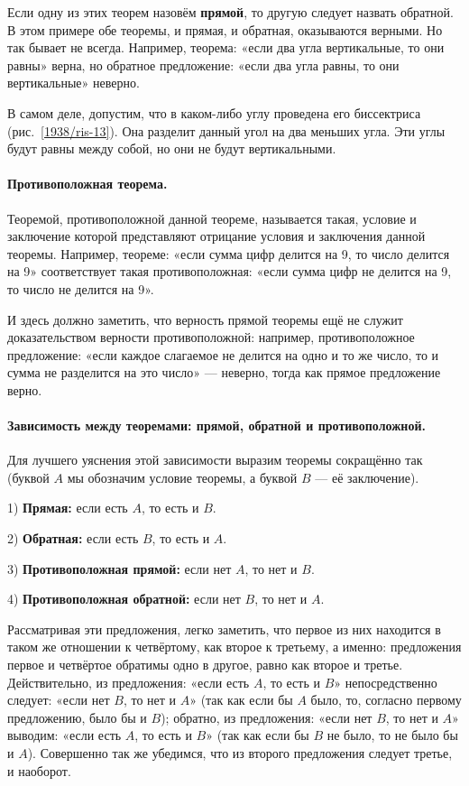 \documentclass[oneside]{book}
\begin{document}
\medskip

Если одну из этих теорем назовём \textbf{прямой}, то другую следует назвать обратной.
В этом примере обе теоремы, и прямая, и обратная, оказываются верными.
Но так бывает не всегда.
Например, теорема:
«если два угла вертикальные, то они равны» верна, но обратное предложение:
«если два угла равны, то они вертикальные» неверно.

В самом деле, допустим, что в каком-либо углу проведена его биссектриса (рис.~\ref{1938/ris-13}).
Она разделит данный угол на два меньших угла.
Эти углы будут равны между собой, но они не будут вертикальными.

\paragraph{Противоположная теорема.}\label{1938/31}
Теоремой, противоположной данной теореме, называется такая, условие и заключение которой представляют отрицание условия и заключения данной теоремы.
Например, теореме:
«если сумма цифр делится на 9, то число делится на 9» соответствует такая противоположная:
«если сумма цифр не делится на 9, то число не делится на 9».

И здесь должно заметить, что верность прямой теоремы ещё не служит доказательством верности противоположной:
например, противоположное предложение:
«если каждое слагаемое не делится на одно и то же число, то и сумма не разделится на это число» — неверно, тогда как прямое предложение верно.

\paragraph{Зависимость между теоремами: прямой, обратной и противоположной.}\label{1938/32}
Для лучшего уяснения этой зависимости выразим теоремы сокращённо так (буквой $A$ мы обозначим условие теоремы, а буквой $B$ — её заключение).

1) \textbf{Прямая:}
если есть $A$, то есть и $B$.

2) \textbf{Обратная:}
если есть $B$, то есть и $A$.

3) \textbf{Противоположная прямой:}
если нет $A$, то нет и $B$.

4) \textbf{Противоположная обратной:}
если нет $B$, то нет и $A$.

Рассматривая эти предложения, легко заметить, что первое из них находится в таком же отношении к четвёртому, как второе к третьему, а именно:
предложения первое и четвёртое обратимы одно в другое, равно как второе и третье.
Действительно, из предложения:
«если есть $A$, то есть и $B$» непосредственно следует:
«если нет $B$, то нет и $A$» (так как если бы $A$ было, то, согласно первому предложению, было бы и $B$);
обратно, из предложения:
«если нет $B$, то нет и $A$» выводим:
«если есть $A$, то есть и $B$» (так как если бы $B$ не было, то не было бы и $A$).
Совершенно так же убедимся, что из второго предложения следует третье, и наоборот.
\end{document}

